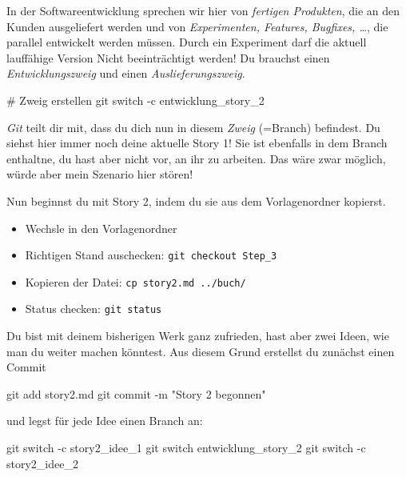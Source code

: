\documentclass[
  letterpaper,
  DIV=11]{scrreprt}
\newenvironment{Shaded}{\begin{snugshade}}{\end{snugshade}}
\newcommand{\AttributeTok}[1]{\textcolor[rgb]{0.40,0.45,0.13}{#1}}
\newcommand{\CommentTok}[1]{\textcolor[rgb]{0.37,0.37,0.37}{#1}}
\newcommand{\FunctionTok}[1]{\textcolor[rgb]{0.28,0.35,0.67}{#1}}
\newcommand{\NormalTok}[1]{\textcolor[rgb]{0.00,0.23,0.31}{#1}}
\newcommand{\StringTok}[1]{\textcolor[rgb]{0.13,0.47,0.30}{#1}}
\providecommand{\tightlist}{%
  \setlength{\itemsep}{0pt}\setlength{\parskip}{0pt}}\usepackage{longtable,booktabs,array}
\begin{document}
In der Softwareentwicklung sprechen wir hier von \emph{fertigen
Produkten}, die an den Kunden ausgeliefert werden und von
\emph{Experimenten, Features, Bugfixes, \ldots{}}, die parallel
entwickelt werden müssen. Durch ein Experiment darf die aktuell
lauffähige Version Nicht beeinträchtigt werden! Du brauchst einen
\emph{Entwicklungszweig} und einen \emph{Auslieferungszweig}.

\begin{Shaded}
\begin{Highlighting}[]
\CommentTok{\# Zweig erstellen }
\FunctionTok{git}\NormalTok{ switch }\AttributeTok{{-}c}\NormalTok{ entwicklung\_story\_2}
\end{Highlighting}
\end{Shaded}

\emph{Git} teilt dir mit, dass du dich nun in diesem \emph{Zweig}
(=Branch) befindest. Du siehst hier immer noch deine aktuelle Story 1!
Sie ist ebenfalls in dem Branch enthaltne, du hast aber nicht vor, an
ihr zu arbeiten. Das wäre zwar möglich, würde aber mein Szenario hier
stören!

Nun beginnst du mit Story 2, indem du sie aus dem Vorlagenordner
kopierst.

\begin{itemize}
\tightlist
\item
  Wechsle in den Vorlagenordner
\item
  Richtigen Stand auschecken: \texttt{git\ checkout\ Step\_3}
\item
  Kopieren der Datei: \texttt{cp\ story2.md\ ../buch/}
\item
  Status checken: \texttt{git\ status}
\end{itemize}

Du bist mit deinem bisherigen Werk ganz zufrieden, hast aber zwei Ideen,
wie man du weiter machen könntest. Aus diesem Grund erstellst du
zunächst einen Commit

\begin{Shaded}
\begin{Highlighting}[]
\FunctionTok{git}\NormalTok{ add story2.md }
\FunctionTok{git}\NormalTok{ commit }\AttributeTok{{-}m} \StringTok{"Story 2 begonnen"}
\end{Highlighting}
\end{Shaded}

und legst für jede Idee einen Branch an:

\begin{Shaded}
\begin{Highlighting}[]
\FunctionTok{git}\NormalTok{ switch }\AttributeTok{{-}c}\NormalTok{ story2\_idee\_1}
\FunctionTok{git}\NormalTok{ switch entwicklung\_story\_2}
\FunctionTok{git}\NormalTok{ switch }\AttributeTok{{-}c}\NormalTok{ story2\_idee\_2}
\end{Highlighting}
\end{Shaded}
\end{document}
